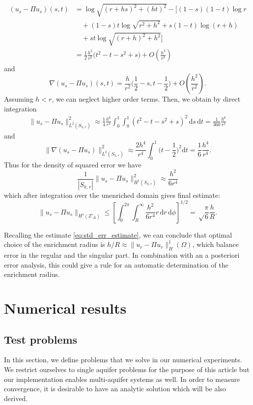 \documentclass{elsarticle}
\def\abs#1{\left|#1\right|}
\def\d{\mathrm{d}}
\def\norm#1{\| #1 \|}
\def\abs#1{| #1 |}
\begin{document}
\begin{align*}
 (u_s - \Pi u_s)(s,t)&=\log\sqrt{(r+hs)^2+(ht)^2} -\Big[(1-s)(1-t)\log r\\
 &\quad+ (1-s)t\log\sqrt{r^2+h^2} + s(1-t) \log(r+h) \\
 &\quad+ st\log\sqrt{(r+h)^2+h^2} \Big]\\
 &=\frac12 \frac{h^2}{r^2}\big(t^2-t - s^2 +s\big) + O(\frac{h^3}{r^3})
\end{align*}
and 
\begin{equation}
 \nabla(u_s - \Pi u_s)(s,t) = \frac{h}{r^2} \Big( \frac12-s, t-\frac12 \Big) + O(\frac{h^2}{r^2}).
\end{equation}
Assuming $h<r$, we can neglect higher order terms. Then, we obtain by direct integration
\begin{align*}
 \norm{u_s - \Pi u_s}^2_{L^2(S_{h,r})} \approx \frac14 \frac{h^6}{r^4}\int_0^1\int_0^1 (t^2-t-s^2+s)^2\,\d s\, \d t = \frac{1}{360}\frac{h^6}{r^4} 
\end{align*}
and
\begin{equation}
    \label{eq:grad_estimate_on_square}
    \norm{\nabla(u_s - \Pi u_s)}^2_{L^2(S_{h,r})} \approx \frac{2h^4}{r^4} \int_0^1 \Big(t-\frac12\Big)^2 \d t = \frac{1}{6}\frac{h^4}{r^4}.
\end{equation}
Thus for the density of squared error we have
\[
    \frac{1}{\abs{S_{h,r}}} \norm{u_s - \Pi u_s}^2_{H^1(S_{h,r})} \approx \frac{h^2}{6r^4}
\]
which after integration over the unenriched domain gives final estimate:
\begin{equation}
    \label{eq:singular_approx_error}
    \norm{u_s - \Pi u_s}_{H^1(Z'_R)} \le \left[\int_0^{2\pi} \int_R^\infty \frac{h^2} {6r^4} r \,\d r\, \d \phi\right]^{1/2} = \sqrt\frac{\pi}{6}\frac{h}{R}. 
\end{equation}

Recalling the estimate \eqref{eq:std_err_estimate}, we can conclude that optimal choice of the enrichment radius is $h/R\approx \norm{u_r-\Pi u_r}_H^1(\Omega)$, 
which balance error in the regular and the singular part. In combination with an a posteriori error analysis, this could give a rule for an automatic
determination of the enrichment radius.



\section{Numerical results}
\label{sec:results}

\subsection{Test problems} \label{sec:test_cases}
In this section, we define problems that we solve in our numerical experiments. We restrict ourselves to 
single aquifer problems for the purpose of this article but our implementation enables multi-aquifer systems 
as well. In order to measure convergence, it is desirable to have an analytic solution which will be also derived. 
\end{document}
